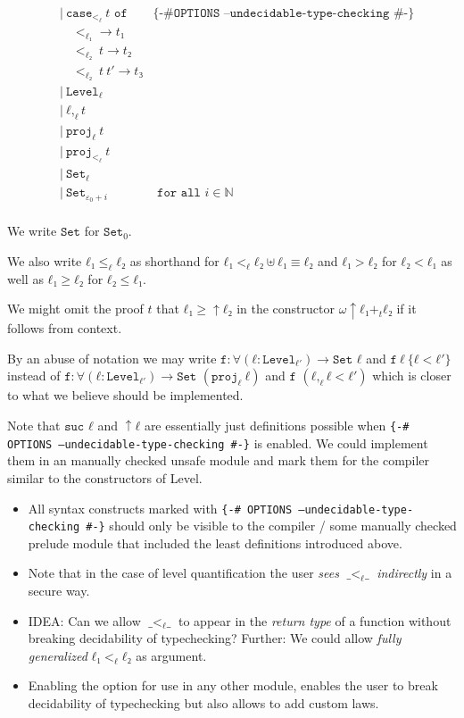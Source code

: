 \documentclass[runningheads,fleqn]{llncs}
\begin{document}
\begin{align*}
  &|\ \texttt{case}_{<_ℓ} \ t \texttt{ of } & \texttt{\{-\# OPTIONS --undecidable-type-checking \#-\}} \\
  & \quad <_{ℓ₁}→ t₁ \\
  & \quad <_{ℓ₂} \ t → t₂ \\
  & \quad <_{ℓ₂} \ t \ t′ → t₃ \\
  &|\ \texttt{Level}_ℓ \\
  &|\ ℓ ,_ℓ t \\  
  &|\ \texttt{proj}_ℓ \ t \\
  &|\ \texttt{proj}_{<_ℓ} \ t \\
  &|\ \texttt{Set}_ℓ \\
  &|\ \texttt{Set}_{ε_0+i} & \texttt{ for all } i ∈ ℕ \\
\end{align*}

We write $\texttt{Set}$ for $\texttt{Set}_0$.

We also write $ℓ₁ ≤_ℓ ℓ₂$ as shorthand for $ℓ₁ <_ℓ ℓ₂ ⊎ ℓ₁ ≡ ℓ₂$ and $ℓ₁ > ℓ₂$ for $ℓ₂ < ℓ₁$ as well as $ℓ₁ ≥ ℓ₂$ for $ℓ₂ ≤ ℓ₁$.


We might omit the proof $t$ that $ℓ₁ ≥ ↑ ℓ₂$ in the constructor $ω ↑ ℓ₁ +_t ℓ₂$ if it follows from context.

By an abuse of notation we may write $\texttt{f} : ∀(ℓ : \texttt{Level}_{ℓ′}) → \texttt{Set } ℓ$ and $\texttt{f} \ ℓ \ \{ℓ<ℓ′\}$ instead of $\texttt{f} : ∀(ℓ : \texttt{Level}_{ℓ′}) → \texttt{Set } (\texttt{proj}_ℓ \ ℓ)$ and $\texttt{f } (ℓ ,_ℓ ℓ<ℓ′)$ which is closer to what we believe should be implemented.


Note that $\texttt{suc } ℓ$ and $↑ ℓ$ are essentially just definitions possible when \texttt{\{-\# OPTIONS --undecidable-type-checking \#-\}} is enabled.
We could implement them in an manually checked unsafe module and mark them for the compiler similar to the constructors of Level.

\begin{itemize}
 \item All syntax constructs marked with \texttt{\{-\# OPTIONS --undecidable-type-checking \#-\}} should only be visible to the compiler / some manually checked prelude module that included the least definitions introduced above. 
 \item Note that in the case of level quantification the user \emph{sees} $\texttt{\_}<_ℓ\texttt{\_}$ \emph{indirectly} in a secure way.
 \item IDEA: Can we allow $\texttt{\_}<_ℓ\texttt{\_}$ to appear in the \emph{return type} of a function without breaking decidability of typechecking? Further: We could allow \emph{fully generalized} $ℓ₁ <_ℓ ℓ₂$ as argument.
 \item Enabling the option for use in any other module, enables the user to break decidability of typechecking but also allows to add custom laws. 
\end{itemize}
\end{document}

